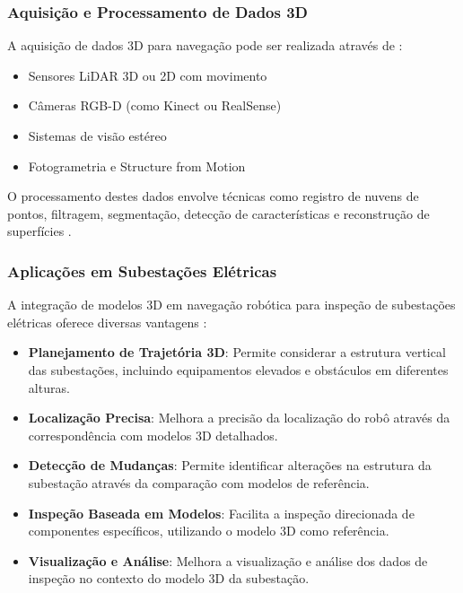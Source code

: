 \subsubsection{Aquisição e Processamento de Dados 3D}

A aquisição de dados 3D para navegação pode ser realizada através de \cite{Rusu2011, Hornung2013}:

\begin{itemize}
    \item Sensores LiDAR 3D ou 2D com movimento
    \item Câmeras RGB-D (como Kinect ou RealSense)
    \item Sistemas de visão estéreo
    \item Fotogrametria e Structure from Motion
\end{itemize}

O processamento destes dados envolve técnicas como registro de nuvens de pontos, filtragem, segmentação, detecção de características e reconstrução de superfícies \cite{Rusu2011}.

\subsubsection{Aplicações em Subestações Elétricas}

A integração de modelos 3D em navegação robótica para inspeção de subestações elétricas oferece diversas vantagens \cite{Lactec2022, Iberdrola2022}:

\begin{itemize}
    \item \textbf{Planejamento de Trajetória 3D}: Permite considerar a estrutura vertical das subestações, incluindo equipamentos elevados e obstáculos em diferentes alturas.
    
    \item \textbf{Localização Precisa}: Melhora a precisão da localização do robô através da correspondência com modelos 3D detalhados.
    
    \item \textbf{Detecção de Mudanças}: Permite identificar alterações na estrutura da subestação através da comparação com modelos de referência.
    
    \item \textbf{Inspeção Baseada em Modelos}: Facilita a inspeção direcionada de componentes específicos, utilizando o modelo 3D como referência.
    
    \item \textbf{Visualização e Análise}: Melhora a visualização e análise dos dados de inspeção no contexto do modelo 3D da subestação.
\end{itemize}

